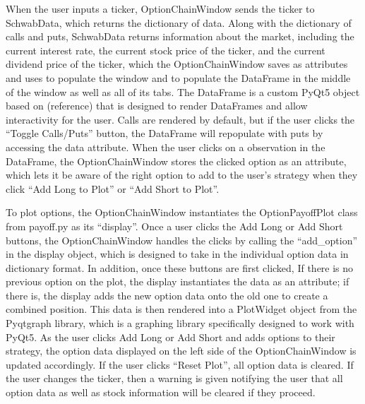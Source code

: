 \documentclass{article}
\begin{document}
\indent When the user inputs a ticker, OptionChainWindow sends the ticker to SchwabData, which returns the dictionary of data. Along with the dictionary of calls and puts, SchwabData returns information about the market, including the current interest rate, the current stock price of the ticker, and the current dividend price of the ticker, which the OptionChainWindow saves as attributes and uses to populate the window and to populate the DataFrame in the middle of the window as well as all of its tabs. The DataFrame is a custom PyQt5 object based on (reference) that is designed to render DataFrames and allow interactivity for the user. Calls are rendered by default, but if the user clicks the \enquote{Toggle Calls/Puts} button, the DataFrame will repopulate with puts by accessing the data attribute. When the user clicks on a observation in the DataFrame, the OptionChainWindow stores the clicked option as an attribute, which lets it be aware of the right option to add to the user's strategy when they click \enquote{Add Long to Plot} or \enquote{Add Short to Plot}. 

\indent To plot options, the OptionChainWindow instantiates the OptionPayoffPlot class from payoff.py as its \enquote{display}. Once a user clicks the Add Long or Add Short buttons, the OptionChainWindow handles the clicks by calling the \enquote{add\_option} in the display object, which is designed to take in the individual option data in dictionary format. In addition, once these buttons are first clicked, If there is no previous option on the plot, the display instantiates the data as an attribute; if there is, the display adds the new option data onto the old one to create a combined position. This data is then rendered into a PlotWidget object from the Pyqtgraph library, which is a graphing library specifically designed to work with PyQt5. As the user clicks Add Long or Add Short and adds options to their strategy, the option data displayed on the left side of the OptionChainWindow is updated accordingly. If the user clicks \enquote{Reset Plot}, all option data is cleared. If the user changes the ticker, then a warning is given notifying the user that all option data as well as stock information will be cleared if they proceed. 
\end{document}

